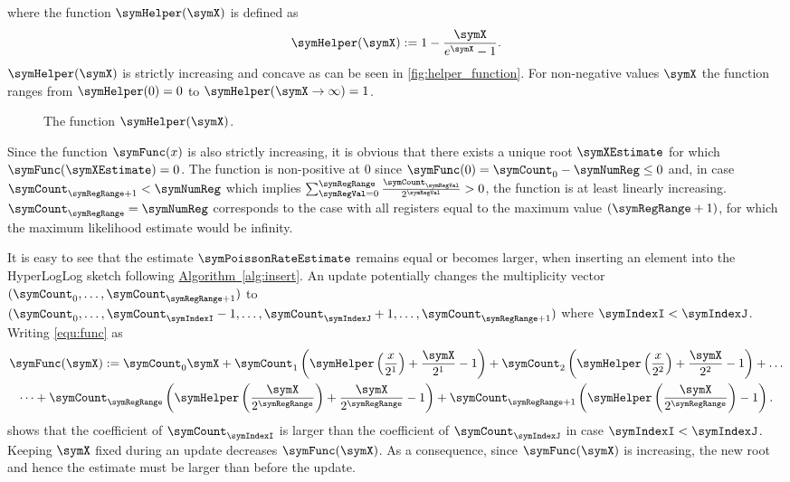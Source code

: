 \documentclass[11pt]{article} %
\newcommand*{\algoref}[1]{\hyperref[#1]{Algorithm~\ref*{#1}}}
\begin{document}
where the function $\symHelper(\symX)$ is defined as
\begin{equation}
\label{equ:helper}
\symHelper(\symX):=1-\frac{\symX}{e^{\symX}-1}.
\end{equation}
$\symHelper(\symX)$ is strictly increasing and concave as can be seen in \autoref{fig:helper_function}. For non-negative values $\symX$ the function ranges from $\symHelper(0)=0$ to $\symHelper(\symX\rightarrow \infty)=1$.
\begin{figure}
\centering

\caption{The function $\symHelper(\symX)$.}
\label{fig:helper_function}
\end{figure}
Since the function $\symFunc(x)$ is also strictly increasing, it is obvious that there exists a unique root $\symXEstimate$ for which $\symFunc(\symXEstimate)=0$. The function is non-positive at 0 since $\symFunc(0)=\symCount_0-\symNumReg\leq 0$ and, in case $\symCount_{\symRegRange+1}<\symNumReg$ which implies $\sum_{\symRegVal=0}^\symRegRange \frac{\symCount_\symRegVal}{2^\symRegVal}>0$, the function is at least linearly increasing. $\symCount_{\symRegRange}=\symNumReg$ corresponds to the case with all registers equal to the maximum value $(\symRegRange+1)$, for which the maximum likelihood estimate would be infinity.

It is easy to see that the estimate $\symPoissonRateEstimate$ remains equal or becomes larger, when inserting an element into the HyperLogLog sketch following \algoref{alg:insert}. An update potentially changes the multiplicity vector $(\symCount_0,\ldots,\symCount_{\symRegRange+1})$ to $(\symCount_0,\ldots,\symCount_\symIndexI-1,\ldots,\symCount_\symIndexJ+1,\ldots,\symCount_{\symRegRange+1})$ where $\symIndexI < \symIndexJ$. Writing \eqref{equ:func} as 
\begin{multline}
\symFunc(\symX)
:=
\symCount_0 \symX
+
\symCount_1 \left(
\symHelper\left(\frac{x}{2^1}\right)
+\frac{\symX}{2^1}-1
\right)
+
\symCount_2 \left(
\symHelper\left(\frac{x}{2^2}\right)
+\frac{\symX}{2^2}-1
\right)
+
\ldots
\\
\dots
+
\symCount_\symRegRange
\left(
\symHelper\left(\frac{\symX}{2^\symRegRange}\right)
+\frac{\symX}{2^\symRegRange}-1
\right)
+
\symCount_{\symRegRange+1}
\left(
\symHelper\left(\frac{\symX}{2^{\symRegRange}}\right)
-1
\right).
\end{multline}
shows that the coefficient of $\symCount_\symIndexI$ is larger than the coefficient of $\symCount_\symIndexJ$ in case $\symIndexI < \symIndexJ$. Keeping $\symX$ fixed during an update decreases $\symFunc(\symX)$. As a consequence, since $\symFunc(\symX)$ is increasing, the new root and hence the estimate must be larger than before the update.
\end{document}
